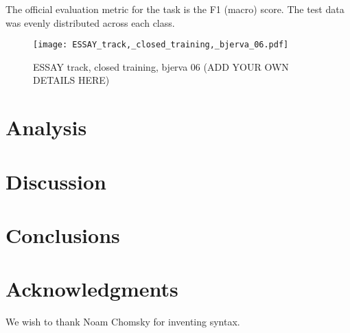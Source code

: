 \documentclass[11pt,letterpaper]{article}
\begin{document}

The official evaluation metric for the task is the F1 (macro) score.
The test data was evenly distributed across each class.

\begin{figure*}
\centering
\texttt{[image: ESSAY\_track,\_closed\_training,\_bjerva\_06.pdf]}
\caption{ESSAY track, closed training, bjerva 06 (ADD YOUR OWN DETAILS HERE)}
\label{fig:1}
\end{figure*}

\section{Analysis}

\section{Discussion}

\section{Conclusions}

\section*{Acknowledgments}

We wish to thank Noam Chomsky for inventing syntax.



\end{document}
